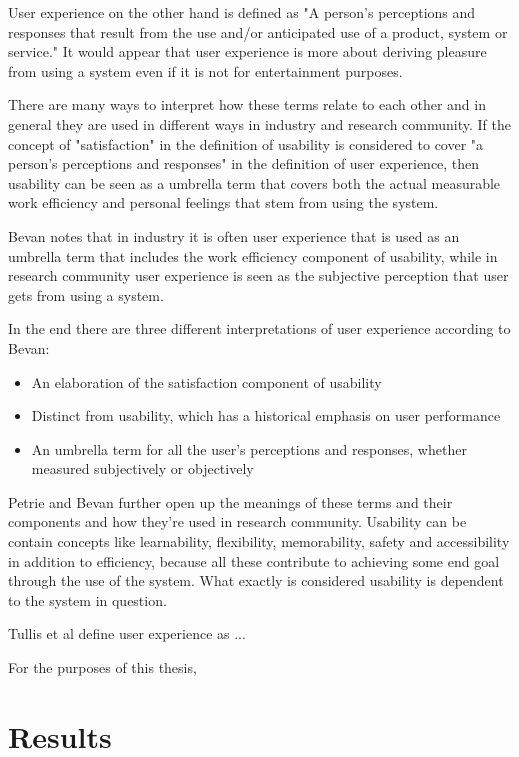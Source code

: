 User experience on the other hand is defined as "A person's perceptions and responses that result from the use and/or anticipated use of a product, system or service." It would appear that user experience is more about deriving pleasure from using a system even if it is not for entertainment purposes.

There are many ways to interpret how these terms relate to each other and in general they are used in different ways in industry and research community. If the concept of "satisfaction" in the definition of usability is considered to cover "a person's perceptions and responses" in the definition of user experience, then usability can be seen as a umbrella term that covers both the actual measurable work efficiency and personal feelings that stem from using the system.

Bevan notes that in industry it is often user experience that is used as an umbrella term that includes the work efficiency component of usability, while in research community user experience is seen as the subjective perception that user gets from using a system.

In the end there are three different interpretations of user experience according to Bevan: \begin{itemize}
\item An  elaboration  of  the  satisfaction  component  of usability
\item Distinct  from  usability,  which  has  a  historical emphasis on user performance
\item An  umbrella  term  for  all  the  user’s  perceptions  and responses,  whether  measured  subjectively  or objectively
\end{itemize}
\cite{bevan2009difference}

Petrie and Bevan further open up the meanings of these terms and their components and how they're used in research community. Usability can be contain concepts like learnability, flexibility, memorability, safety and accessibility in addition to efficiency, because all these contribute to achieving some end goal through the use of the system. What exactly is considered usability is dependent to the system in question.
\cite{bevanevaluation}



\cite{bevan2009difference, bevaniso, bevanevaluation, bevanstandard}

Tullis et al define user experience as ...\cite{albert2013measuring}

For the purposes of this thesis, 


\cite{nielsen1995usability, hollingsed2007usability, holzinger2005usability, rubin2008handbook, dumas1999practical, vermeeren2010user, bevan2009difference, vaananen2008towards, laugwitz2008construction, obrist2009user, battleson2001usability, van2003retrospective, hassenzahl2010needs, albert2013measuring}

\section{Results}